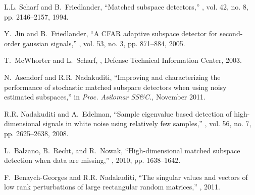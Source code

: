 


%





%
\vskip-0.1cm
\begin{thebibliography}{1}

L.L. Scharf and B.~Friedlander,
\newblock ``Matched subspace detectors,''
, vol. 42, no. 8, pp. 2146--2157, 1994.

Y.~Jin and B.~Friedlander,
\newblock ``A {CFAR} adaptive subspace detector for second-order gaussian
  signals,''
, vol. 53, no. 3, pp. 871--884, 2005.

T.~McWhorter and L.~Scharf,
,
\newblock Defense Technical Information Center, 2003.

N.~Asendorf and R.R. Nadakuditi,
\newblock ``Improving and characterizing the performance of stochastic
  matched subspace detectors when using noisy estimated subspaces,''
\newblock in {\em Proc. Asilomar SS\&C.}, November 2011.

R.R. Nadakuditi and A.~Edelman,
\newblock ``Sample eigenvalue based detection of high-dimensional signals in
  white noise using relatively few samples,''
, vol. 56, no. 7, pp.
  2625--2638, 2008.

L.~Balzano, B.~Recht, and R.~Nowak,
\newblock ``High-dimensional matched subspace detection when data are
  missing,''
, 2010, pp. 1638--1642.

F.~Benaych-Georges and R.R. Nadakuditi,
\newblock ``The singular values and vectors of low rank perturbations of large
  rectangular random matrices,''
, 2011.

\end{thebibliography}



